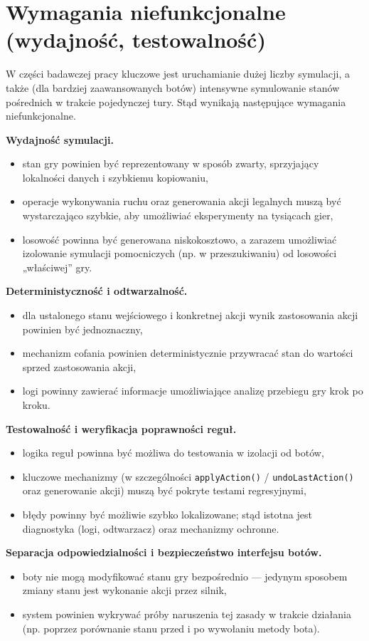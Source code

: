 \documentclass[polish,inz,longabstract]{iithesis}
\begin{document}
\section{Wymagania niefunkcjonalne (wydajność, testowalność)}

W części badawczej pracy kluczowe jest uruchamianie dużej liczby symulacji, a także (dla bardziej zaawansowanych botów) intensywne symulowanie stanów pośrednich w trakcie pojedynczej tury. Stąd wynikają następujące wymagania niefunkcjonalne.

\textbf{Wydajność symulacji.}
\begin{itemize}
\item stan gry powinien być reprezentowany w sposób zwarty, sprzyjający lokalności danych i szybkiemu kopiowaniu,
\item operacje wykonywania ruchu oraz generowania akcji legalnych muszą być wystarczająco szybkie, aby umożliwiać eksperymenty na tysiącach gier,
\item losowość powinna być generowana niskokosztowo, a zarazem umożliwiać izolowanie symulacji pomocniczych (np. w przeszukiwaniu) od losowości „właściwej” gry.
\end{itemize}

\textbf{Deterministyczność i odtwarzalność.}
\begin{itemize}
\item dla ustalonego stanu wejściowego i konkretnej akcji wynik zastosowania akcji powinien być jednoznaczny,
\item mechanizm cofania powinien deterministycznie przywracać stan do wartości sprzed zastosowania akcji,
\item logi powinny zawierać informacje umożliwiające analizę przebiegu gry krok po kroku.
\end{itemize}

\textbf{Testowalność i weryfikacja poprawności reguł.}
\begin{itemize}
\item logika reguł powinna być możliwa do testowania w izolacji od botów,
\item kluczowe mechanizmy (w szczególności \texttt{applyAction()} / \texttt{undoLastAction()} oraz generowanie akcji) muszą być pokryte testami regresyjnymi,
\item błędy powinny być możliwie szybko lokalizowane; stąd istotna jest diagnostyka (logi, odtwarzacz) oraz mechanizmy ochronne.
\end{itemize}

\textbf{Separacja odpowiedzialności i bezpieczeństwo interfejsu botów.}
\begin{itemize}
\item boty nie mogą modyfikować stanu gry bezpośrednio — jedynym sposobem zmiany stanu jest wykonanie akcji przez silnik,
\item system powinien wykrywać próby naruszenia tej zasady w trakcie działania (np. poprzez porównanie stanu przed i po wywołaniu metody bota).
\end{itemize}
\end{document}
